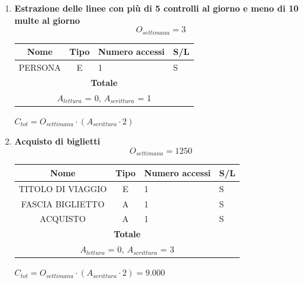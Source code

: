 \documentclass[12pt,a4paper]{report}
\begin{document}
\begin{enumerate}[label=\textbf{\arabic*)}]
    \item \textbf{Estrazione delle linee con più di 5 controlli al giorno e meno di 10 multe al giorno } \\
    \[ {O_{settimana} = 3} \]
    \begin{table}[H]
    \centering
    \begin{tabular}{|c|c|l|l|}
    \hline
    \textbf{Nome} & \textbf{Tipo} & \textbf{Numero accessi} & \textbf{S/L} \\
    \hline
    PERSONA & E & 1 & S \\
    \hline
    \multicolumn{4}{c}{\textbf{Totale}} \\    
    \multicolumn{4}{c}{${A_{lettura}}$ = 0, ${A_{scrittura}}$ = 1} \\
    \hline
    \end{tabular}
    \end{table}
    \begin{center}
    ${C_{tot} = {O_{settimana}}\cdot({A_{scrittura}}\cdot 2)}$
    \end{center}

    \item \textbf{Acquisto di biglietti} \\
    \[ {O_{settimana} = 1250} \]
    \begin{table}[H]
    \centering
    \begin{tabular}{|c|c|l|l|}
    \hline
    \textbf{Nome} & \textbf{Tipo} & \textbf{Numero accessi} & \textbf{S/L} \\
    \hline
    TITOLO DI VIAGGIO & E & 1 & S \\
    \hline
    FASCIA BIGLIETTO & A & 1 & S \\
    \hline
    ACQUISTO & A & 1 & S \\
    \hline
    \multicolumn{4}{c}{\textbf{Totale}} \\    
    \multicolumn{4}{c}{${A_{lettura}}$ = 0, ${A_{scrittura}}$ = 3} \\
    \hline
    \end{tabular}
    \end{table}
    \begin{center}
    ${C_{tot} = {O_{settimana}}\cdot({A_{scrittura}}\cdot 2) = 9.000}$
    \end{center}


\end{enumerate}
\end{document}
